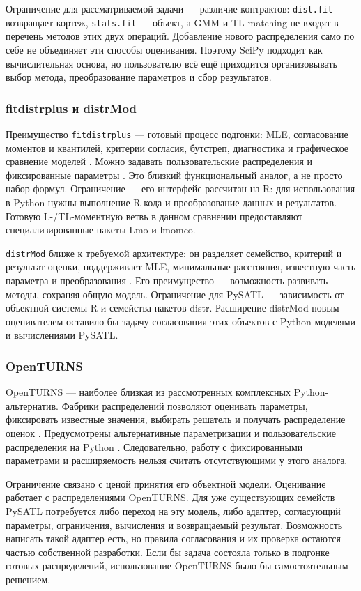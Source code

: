 Ограничение для рассматриваемой задачи --- различие контрактов:
\texttt{dist.fit} возвращает кортеж, \texttt{stats.fit} --- объект,
а GMM и TL-matching не входят в перечень методов этих двух операций.
Добавление нового распределения само по себе не объединяет эти способы
оценивания. Поэтому SciPy подходит как вычислительная основа, но
пользователю всё ещё приходится организовывать выбор метода,
преобразование параметров и сбор результатов.

\subsubsection{fitdistrplus и distrMod}
Преимущество \texttt{fitdistrplus} --- готовый процесс подгонки:
MLE, согласование моментов и квантилей, критерии согласия, бутстреп,
диагностика и графическое сравнение моделей \cite{reviewFitdistrArticle}.
Можно задавать пользовательские распределения и фиксированные параметры
\cite{reviewFitdistrManual}. Это близкий функциональный аналог,
а не просто набор формул. Ограничение --- его интерфейс рассчитан на R:
для использования в Python нужны выполнение R-кода и преобразование
данных и результатов. Готовую L-/TL-моментную ветвь в данном сравнении предоставляют
специализированные пакеты Lmo и lmomco.

\texttt{distrMod} ближе к требуемой архитектуре: он разделяет семейство,
критерий и результат оценки, поддерживает MLE, минимальные расстояния,
известную часть параметра и преобразования \cite{reviewDistrMod}.
Его преимущество --- возможность развивать методы, сохраняя общую модель.
Ограничение для PySATL --- зависимость от объектной системы R и
семейства пакетов distr. Расширение distrMod новым оценивателем оставило бы
задачу согласования этих объектов с Python-моделями и вычислениями PySATL.

\subsubsection{OpenTURNS}
OpenTURNS --- наиболее близкая из рассмотренных комплексных
Python-альтернатив. Фабрики распределений позволяют оценивать параметры,
фиксировать известные значения, выбирать решатель и получать
распределение оценок \cite{reviewOTMLE}. Предусмотрены альтернативные
параметризации и пользовательские распределения на Python
\cite{reviewOTParameters,reviewOTPythonDistribution}.
Следовательно, работу с фиксированными параметрами и расширяемость
нельзя считать отсутствующими у этого аналога.

Ограничение связано с ценой принятия его объектной модели.
Оценивание работает с распределениями OpenTURNS. Для уже существующих
семейств PySATL потребуется либо переход на эту модель, либо адаптер,
согласующий параметры, ограничения, вычисления и возвращаемый результат.
Возможность написать такой адаптер есть, но правила согласования
и их проверка остаются частью собственной разработки.
Если бы задача состояла только в подгонке готовых распределений,
использование OpenTURNS было бы самостоятельным решением.


